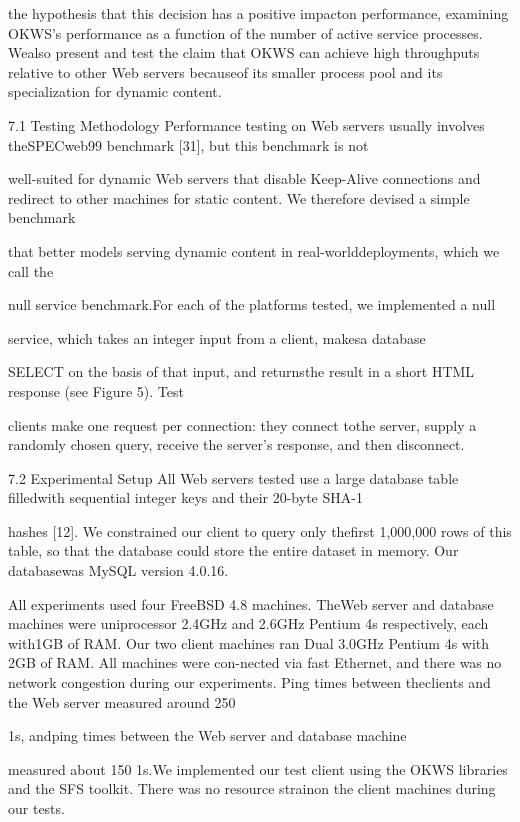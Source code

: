 the hypothesis that this decision has a positive impacton performance, examining OKWS's performance as a
function of the number of active service processes. Wealso present and test the claim that OKWS can achieve
high throughputs relative to other Web servers becauseof its smaller process pool and its specialization for dynamic content.

7.1 Testing Methodology
Performance testing on Web servers usually involves theSPECweb99 benchmark [31], but this benchmark is not

well-suited for dynamic Web servers that disable Keep-Alive connections and redirect to other machines for
static content. We therefore devised a simple benchmark

that better models serving dynamic content in real-worlddeployments, which we call the

null service benchmark.For each of the platforms tested, we implemented a null

service, which takes an integer input from a client, makesa database

SELECT on the basis of that input, and returnsthe result in a short HTML response (see Figure 5). Test

clients make one request per connection: they connect tothe server, supply a randomly chosen query, receive the
server's response, and then disconnect.

7.2 Experimental Setup
All Web servers tested use a large database table filledwith sequential integer keys and their 20-byte SHA-1

hashes [12]. We constrained our client to query only thefirst 1,000,000 rows of this table, so that the database
could store the entire dataset in memory. Our databasewas MySQL version 4.0.16.

All experiments used four FreeBSD 4.8 machines. TheWeb server and database machines were uniprocessor
2.4GHz and 2.6GHz Pentium 4s respectively, each with1GB of RAM. Our two client machines ran Dual 3.0GHz
Pentium 4s with 2GB of RAM. All machines were con-nected via fast Ethernet, and there was no network congestion during our experiments. Ping times between theclients and the Web server measured around 250

1s, andping times between the Web server and database machine

measured about 150 1s.We implemented our test client using the OKWS libraries and the SFS toolkit. There was no resource strainon the client machines during our tests.

